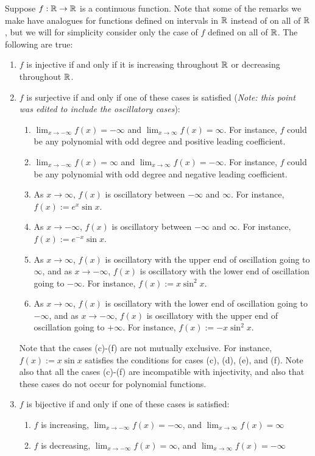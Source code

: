 \documentclass[10pt]{amsart}
\begin{document}
Suppose $f:\mathbb{R} \to \mathbb{R}$ is a continuous function. Note that some of the
remarks we make have analogues for functions defined on intervals in
$\mathbb{R}$ instead of on all of $\mathbb{R}$, but we will for simplicity consider
only the case of $f$ defined on all of $\mathbb{R}$. The following are true:

\begin{enumerate}
\item $f$ is injective if and only if it is increasing throughout $\mathbb{R}$
  or decreasing throughout $\mathbb{R}$.
\item $f$ is surjective if and only if one of these cases is satisfied
  ({\em Note: this point was edited to include the oscillatory cases}):

  \begin{enumerate}
  \item $\lim_{x \to -\infty} f(x) = -\infty$ and $\lim_{x \to \infty}
    f(x) = \infty$. For instance, $f$ could be any polynomial with odd
    degree and positive leading coefficient.
  \item $\lim_{x \to-\infty} f(x) = \infty$ and $\lim_{x \to \infty}
    f(x) = -\infty$. For instance, $f$ could be any polynomial with
    odd degree and negative leading coefficient.
  \item As $x \to \infty$, $f(x)$ is oscillatory between $-\infty$ and
    $\infty$. For instance, $f(x) := e^x\sin x$.
  \item As $x \to -\infty$, $f(x)$ is oscillatory between $-\infty$
    and $\infty$. For instance, $f(x) := e^{-x}\sin x$.
  \item As $x \to \infty$, $f(x)$ is oscillatory with the upper end of
    oscillation going to $\infty$, and as $x \to -\infty$, $f(x)$ is
    oscillatory with the lower end of oscillation going to
    $-\infty$. For instance, $f(x) := x \sin^2x$.
  \item As $x \to \infty$, $f(x)$ is oscillatory with the lower end of
    oscillation going to $-\infty$, and as $x \to -\infty$, $f(x)$ is
    oscillatory with the upper end of oscillation going to
    $+\infty$. For instance, $f(x) := -x\sin^2x$.
  \end{enumerate}

  Note that the cases (c)-(f) are not mutually exclusive. For
  instance, $f(x) := x \sin x$ satisfies the conditions for cases (c),
  (d), (e), and (f). Note also that all the cases (c)-(f) are
  incompatible with injectivity, and also that these cases do not
  occur for polynomial functions.

\item $f$ is bijective if and only if one of these cases is satisfied:

  \begin{enumerate}
  \item $f$ is increasing, $\lim_{x \to -\infty} f(x) = -\infty$, and
    $\lim_{x \to \infty} f(x) = \infty$
  \item $f$ is decreasing, $\lim_{x \to-\infty} f(x) = \infty$, and
    $\lim_{x \to \infty} f(x) = -\infty$
  \end{enumerate}
\end{enumerate}
\end{document}
